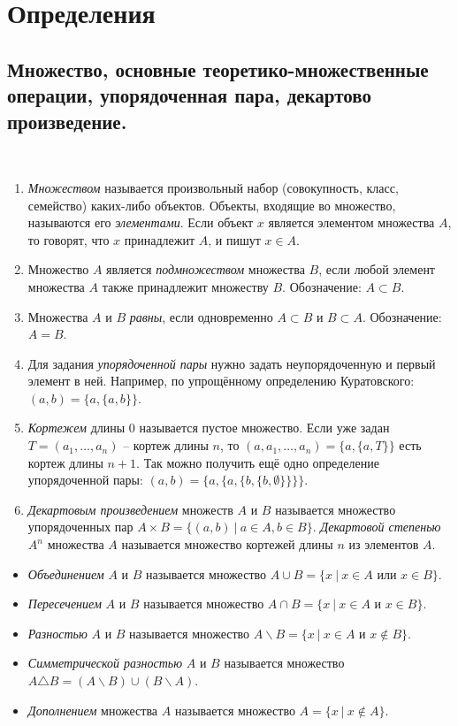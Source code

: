 \section{Определения}

\subsection{Множество, основные теоретико-множественные операции, упорядоченная пара, декартово произведение.}
\
\begin{enumerate}
    \item \textit{Множеством} называется произвольный набор (совокупность, класс, семейство) каких-либо объектов. Объекты, входящие во множество, называются его \textit{элементами}. Если объект $x$ является элементом множества $A$, то говорят, что $x$ принадлежит $A$, и пишут $x \in A$.
    \item Множество $A$ является \textit{подмножеством} множества $B$, если любой элемент множества $A$ также принадлежит множеству $B$. Обозначение: $A \subset B$.
    \item Множества $A$ и $B$ \textit{равны}, если одновременно $A \subset B$ и $B \subset A$. Обозначение: $A = B$.
    \item  Для задания \textit{упорядоченной пары} нужно задать неупорядоченную и первый элемент в ней. Например, по упрощённому определению Куратовского: $(a, b) = \{a, \{a, b\}\}$.
    \item \textit{Кортежем} длины 0 называется пустое множество. Если уже задан $T = (a_{1}, \ldots, a_{n})$ -- кортеж длины $n$, то $(a, a_{1}, \ldots, a_{n}) = \{a, \{a, T\}\}$ есть кортеж длины $n + 1$. Так можно получить ещё одно определение упорядоченной пары: $(a, b) = \{a, \{a, \{b, \{b, \emptyset\}\}\}\}$.
    \item \textit{Декартовым произведением} множеств $A$ и $B$ называется множество упорядоченных пар $A \times B = \{(a, b) \ | \ a \in A, b \in B\}$. \textit{Декартовой степенью} $A^n$ множества $A$ называется множество кортежей длины $n$ из элементов $A$.
\end{enumerate}

\begin{itemize}
    \item \textit{Объединением} $A$ и $B$ называется множество $A \cup B = \{x \ | \ x \in A \text{ или } x \in B\}$.
    \item \textit{Пересечением} $A$ и $B$ называется множество $A \cap B = \{x \ | \ x \in A \text{ и } x \in B\}$.
    \item \textit{Разностью} $A$ и $B$ называется множество $A \backslash B = \{x \ | \ x \in A \text{ и } x \not\in B\}$.
    \item \textit{Симметрической разностью} $A$ и $B$ называется множество $A \triangle B = (A \backslash B) \cup (B \backslash A)$.
    \item \textit{Дополнением} множества $A$ называется множество $A = \{x \ | \ x \not\in A\}$.
\end{itemize}

